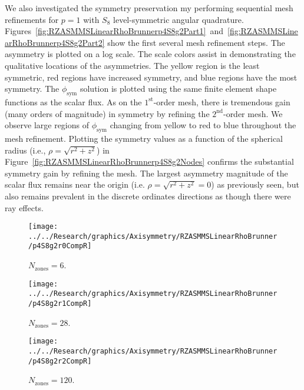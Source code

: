 \documentclass[12pt]{article}
\begin{document}
We also investigated the symmetry preservation my performing sequential mesh refinements for $p=1$ with $S_8$ level-symmetric angular quadrature. Figures~\ref{fig:RZASMMSLinearRhoBrunnerp4S8g2Part1}~and~\ref{fig:RZASMMSLinearRhoBrunnerp4S8g2Part2} show the first several mesh refinement steps. The asymmetry is plotted on a log scale. The scale colors assist in demonstrating the qualitative locations of the asymmetries. The yellow region is the least symmetric, red regions have increased symmetry, and blue regions have the most symmetry. The $\phi_\text{sym}$ solution is plotted using the same finite element shape functions as the scalar flux. As on the $1^\text{st}$-order mesh, there is tremendous gain (many orders of magnitude) in symmetry by refining the $2^\text{nd}$-order mesh. We observe large regions of $\phi_\text{sym}$ changing from yellow to red to blue throughout the mesh refinement. Plotting the symmetry values as a function of the spherical radius (i.e., $\rho=\sqrt{r^2+z^2}$) in Figure~\ref{fig:RZASMMSLinearRhoBrunnerp4S8g2Nodes} confirms the substantial symmetry gain by refining the mesh. The largest asymmetry magnitude of the scalar flux remains near the origin (i.e. $\rho=\sqrt{r^2+z^2}=0$) as previously seen, but also remains prevalent in the discrete ordinates directions as though there were ray effects.

\begin{sidewaysfigure}[!htb]
\centering
\begin{subfigure}{0.33\textwidth}
\texttt{[image: ../../Research/graphics/Axisymmetry/RZASMMSLinearRhoBrunner/p4S8g2r0CompR]}
\caption{$N_\text{zones}=6$.}
\end{subfigure}%
\begin{subfigure}{0.33\textwidth}
\texttt{[image: ../../Research/graphics/Axisymmetry/RZASMMSLinearRhoBrunner/p4S8g2r1CompR]}
\caption{$N_\text{zones}=28$.}
\end{subfigure}%
\begin{subfigure}{0.33\textwidth}
\texttt{[image: ../../Research/graphics/Axisymmetry/RZASMMSLinearRhoBrunner/p4S8g2r2CompR]}
\caption{$N_\text{zones}=120$.}
\end{subfigure}
\caption{Relative asymmetry for $p=4$ finite elements on a $2^\text{nd}$-order mesh for $S_8$ level-symmetric angular quadrature.}
\label{fig:RZASMMSLinearRhoBrunnerp4S8g2Part1}
\end{sidewaysfigure}
\end{document}
